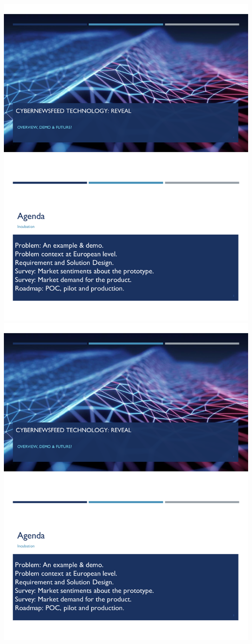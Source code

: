 \includegraphics[page=2,scale=0.75]{Appendices/Threat-Brief-Product-marcel.pdf} 
\includegraphics[page=3,scale=0.75]{Appendices/Threat-Brief-Product-marcel.pdf} 
